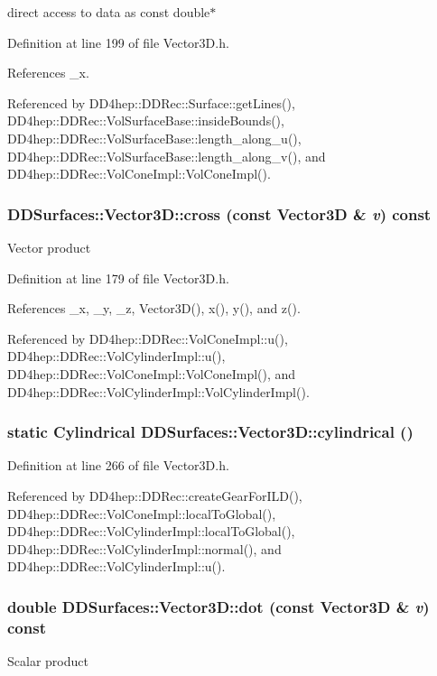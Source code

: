 direct access to data as const double$\ast$ 

Definition at line 199 of file Vector3D.h.

References \_\-x.

Referenced by DD4hep::DDRec::Surface::getLines(), DD4hep::DDRec::VolSurfaceBase::insideBounds(), DD4hep::DDRec::VolSurfaceBase::length\_\-along\_\-u(), DD4hep::DDRec::VolSurfaceBase::length\_\-along\_\-v(), and DD4hep::DDRec::VolConeImpl::VolConeImpl().\hypertarget{class_d_d_surfaces_1_1_vector3_d_af5442c28fbaf25088d92faea39ad8fee}{
\subsubsection[{cross}]{ DDSurfaces::Vector3D::cross (const {\bf Vector3D} \& {\em v}) const}}
\label{class_d_d_surfaces_1_1_vector3_d_af5442c28fbaf25088d92faea39ad8fee}
Vector product 

Definition at line 179 of file Vector3D.h.

References \_\-x, \_\-y, \_\-z, Vector3D(), x(), y(), and z().

Referenced by DD4hep::DDRec::VolConeImpl::u(), DD4hep::DDRec::VolCylinderImpl::u(), DD4hep::DDRec::VolConeImpl::VolConeImpl(), and DD4hep::DDRec::VolCylinderImpl::VolCylinderImpl().\hypertarget{class_d_d_surfaces_1_1_vector3_d_aa9467dc445dfa66633113f4d17dd3be8}{
\subsubsection[{cylindrical}]{\setlength{\rightskip}{0pt plus 5cm}static {\bf Cylindrical} DDSurfaces::Vector3D::cylindrical ()}}
\label{class_d_d_surfaces_1_1_vector3_d_aa9467dc445dfa66633113f4d17dd3be8}


Definition at line 266 of file Vector3D.h.

Referenced by DD4hep::DDRec::createGearForILD(), DD4hep::DDRec::VolConeImpl::localToGlobal(), DD4hep::DDRec::VolCylinderImpl::localToGlobal(), DD4hep::DDRec::VolCylinderImpl::normal(), and DD4hep::DDRec::VolCylinderImpl::u().\hypertarget{class_d_d_surfaces_1_1_vector3_d_ab8ecaacfe342b30405674f5c9a333677}{
\subsubsection[{dot}]{\setlength{\rightskip}{0pt plus 5cm}double DDSurfaces::Vector3D::dot (const {\bf Vector3D} \& {\em v}) const}}
\label{class_d_d_surfaces_1_1_vector3_d_ab8ecaacfe342b30405674f5c9a333677}
Scalar product 

